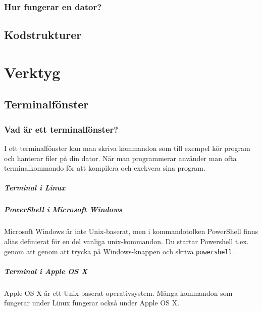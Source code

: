 \documentclass[a4paper]{compendium}
\begin{document}
\lipsum
\lipsum

\section{Hur fungerar en dator?}

\lipsum

\lipsum


\chapter{Kodstrukturer}
\lipsum


\part{Verktyg}



\chapter{Terminalfönster}

\section{Vad är ett terminalfönster?}

I ett terminalfönster kan man skriva kommandon som till exempel kör program och hanterar filer på din dator. När man programmerar använder man ofta terminalkommando för att kompilera och exekvera sina program.   
 
\subsubsection{Terminal i Linux}

\subsubsection{PowerShell i Microsoft Windows}
Microsoft Windows är inte Unix-baserat, men i kommandotolken PowerShell finns alias definierat för en del vanliga unix-kommandon. Du startar Powershell t.ex. genom att genom att trycka på Windows-knappen och skriva \texttt{powershell}.

\subsubsection{Terminal i Apple OS X}
Apple OS X är ett Unix-baserat operativsystem. Många kommandon som fungerar under Linux fungerar också under Apple OS X.
\end{document}
